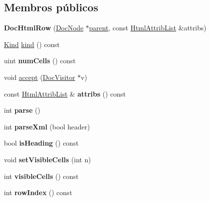 \subsection*{Membros públicos}
\begin{DoxyCompactItemize}
\item 
\hypertarget{class_doc_html_row_a193766a39245f6ed12b98a53313164aa}{{\bfseries Doc\-Html\-Row} (\hyperlink{class_doc_node}{Doc\-Node} $\ast$\hyperlink{class_doc_node_abd7f070d6b0a38b4da71c2806578d19d}{parent}, const \hyperlink{class_html_attrib_list}{Html\-Attrib\-List} \&attribs)}\label{class_doc_html_row_a193766a39245f6ed12b98a53313164aa}

\item 
\hyperlink{class_doc_node_aa10c9e8951b8ccf714a59ec321bdac5b}{Kind} \hyperlink{class_doc_html_row_aa9d037bed9f9a083d0cd01485637d843}{kind} () const 
\item 
\hypertarget{class_doc_html_row_a96cdea1e3d8455770c8e2270d0cb0dde}{uint {\bfseries num\-Cells} () const }\label{class_doc_html_row_a96cdea1e3d8455770c8e2270d0cb0dde}

\item 
void \hyperlink{class_doc_html_row_a7ba716e854ae2f8f87a4eb2140e302b6}{accept} (\hyperlink{class_doc_visitor}{Doc\-Visitor} $\ast$v)
\item 
\hypertarget{class_doc_html_row_aae3c838ea3d3273b35d07e9965a8985e}{const \hyperlink{class_html_attrib_list}{Html\-Attrib\-List} \& {\bfseries attribs} () const }\label{class_doc_html_row_aae3c838ea3d3273b35d07e9965a8985e}

\item 
\hypertarget{class_doc_html_row_a67007fc2be130666fbf3b065022756f4}{int {\bfseries parse} ()}\label{class_doc_html_row_a67007fc2be130666fbf3b065022756f4}

\item 
\hypertarget{class_doc_html_row_a33071bf8f5ad1a907f383db6b1568f58}{int {\bfseries parse\-Xml} (bool header)}\label{class_doc_html_row_a33071bf8f5ad1a907f383db6b1568f58}

\item 
\hypertarget{class_doc_html_row_ade05d6ce722372f5c6779febf0ffab8b}{bool {\bfseries is\-Heading} () const }\label{class_doc_html_row_ade05d6ce722372f5c6779febf0ffab8b}

\item 
\hypertarget{class_doc_html_row_a2ac16a4c3a2e91f19599e99e340a16a9}{void {\bfseries set\-Visible\-Cells} (int n)}\label{class_doc_html_row_a2ac16a4c3a2e91f19599e99e340a16a9}

\item 
\hypertarget{class_doc_html_row_a750473e5d7b3ec89c8b3dbd68ac4975f}{int {\bfseries visible\-Cells} () const }\label{class_doc_html_row_a750473e5d7b3ec89c8b3dbd68ac4975f}

\item 
\hypertarget{class_doc_html_row_a21ddbe149bd2ad1a2114e9adcd847923}{int {\bfseries row\-Index} () const }\label{class_doc_html_row_a21ddbe149bd2ad1a2114e9adcd847923}

\end{DoxyCompactItemize}
